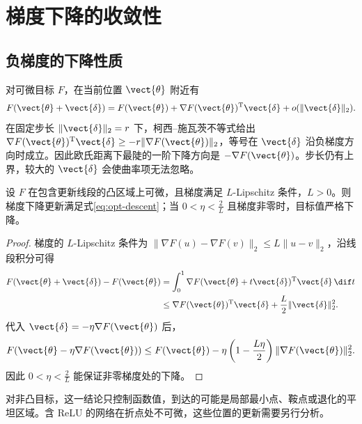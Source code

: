 \documentclass[../textbook.tex]{subfiles}
\begin{document}
\section{梯度下降的收敛性}

\subsection{负梯度的下降性质}
对可微目标 $F$，在当前位置 $\vect{\theta}$ 附近有
\begin{equation}
 F(\vect{\theta}+\vect{\delta})=F(\vect{\theta})+\nabla F(\vect{\theta})^{\mathrm{T}}\vect{\delta}+o(\|\vect{\delta}\|_2).
\end{equation}
在固定步长 $\|\vect{\delta}\|_2=r$ 下，柯西--施瓦茨不等式给出
$\nabla F(\vect{\theta})^{\mathrm{T}}\vect{\delta}\geq-r\|\nabla F(\vect{\theta})\|_2$，等号在 $\vect{\delta}$ 沿负梯度方向时成立。因此欧氏距离下最陡的一阶下降方向是 $-\nabla F(\vect{\theta})$。步长仍有上界，较大的 $\vect{\delta}$ 会使曲率项无法忽略。

\begin{proposition}[光滑目标的下降界]
设 $F$ 在包含更新线段的凸区域上可微，且梯度满足 $L$-Lipschitz 条件，$L>0$。则梯度下降更新满足式\eqref{eq:opt-descent}；当 $0<\eta<\frac{2}{L}$ 且梯度非零时，目标值严格下降。
\end{proposition}
\begin{proof}
梯度的 $L$-Lipschitz 条件为
$\|\nabla F(u)-\nabla F(v)\|_2\leq L\|u-v\|_2$，沿线段积分可得
\begin{align}
 F(\vect{\theta}+\vect{\delta})-F(\vect{\theta})
 &=\int_0^1\nabla F(\vect{\theta}+t\vect{\delta})^{\mathrm{T}}\vect{\delta}\,\dif t\notag\\
 &\leq\nabla F(\vect{\theta})^{\mathrm{T}}\vect{\delta}+\frac L2\|\vect{\delta}\|_2^2.
\end{align}
代入 $\vect{\delta}=-\eta\nabla F(\vect{\theta})$ 后，
\begin{equation}
 F(\vect{\theta}-\eta\nabla F(\vect{\theta}))
 \leq F(\vect{\theta})-\eta\left(1-\frac{L\eta}{2}\right)\|\nabla F(\vect{\theta})\|_2^2.\label{eq:opt-descent}
\end{equation}
因此 $0<\eta<\frac{2}{L}$ 能保证非零梯度处的下降。
\end{proof}
对非凸目标，这一结论只控制函数值，到达的可能是局部最小点、鞍点或退化的平坦区域。含 ReLU 的网络在折点处不可微，这些位置的更新需要另行分析。
\end{document}
